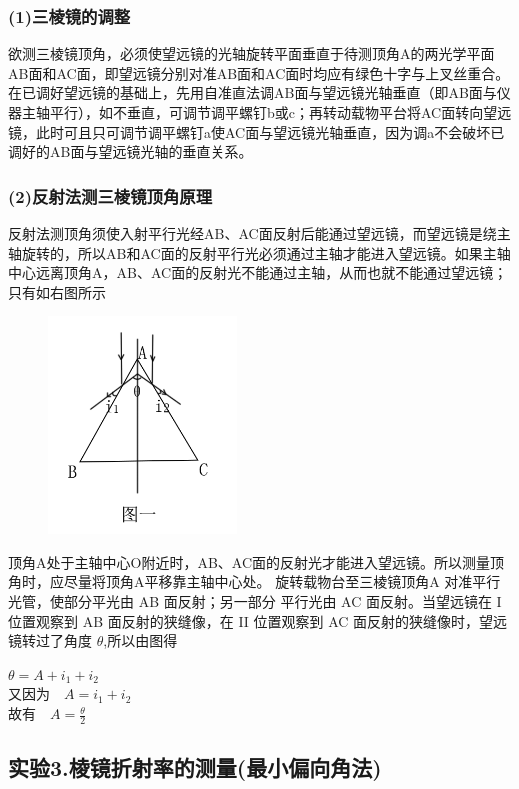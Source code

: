 \documentclass[11pt,a4paper,oneside]{article}
\begin{document}
\subsubsection*{(1)三棱镜的调整}
    欲测三棱镜顶角，必须使望远镜的光轴旋转平面垂直于待测顶角A的两光学平面AB面和AC面，即望远镜分别对准AB面和AC面时均应有绿色十字与上叉丝重合。\\
在已调好望远镜的基础上，先用自准直法调AB面与望远镜光轴垂直（即AB面与仪器主轴平行），如不垂直，可调节调平螺钉b或c；再转动载物平台将AC面转向望远镜，此时可且只可调节调平螺钉a使AC面与望远镜光轴垂直，因为调a不会破坏已调好的AB面与望远镜光轴的垂直关系。

\subsubsection*{(2)反射法测三棱镜顶角原理}
     反射法测顶角须使入射平行光经AB、AC面反射后能通过望远镜，而望远镜是绕主轴旋转的，所以AB和AC面的反射平行光必须通过主轴才能进入望远镜。如果主轴中心远离顶角A，AB、AC面的反射光不能通过主轴，从而也就不能通过望远镜；只有如右图所示
     
 \begin{figure}[H]
 \centering
  \includegraphics[width=5cm]{Image/反射法测顶角.png}
\end{figure}

     
     顶角A处于主轴中心O附近时，AB、AC面的反射光才能进入望远镜。所以测量顶角时，应尽量将顶角A平移靠主轴中心处。
     旋转载物台至三棱镜顶角A 对准平行光管，使部分平光由 AB 面反射；另一部分
平行光由 AC 面反射。当望远镜在 I 位置观察到 AB 面反射的狭缝像，在 II 位置观察到 AC 面反射的狭缝像时，望远镜转过了角度 $\theta$,所以由图得
\begin{center}
$\theta =A+i_{1}+i_{2}$\\
又因为　$A=i_{1}+i_{2}$\\
故有　$A=\displaystyle\frac{\theta}{2}$
\end{center}
     
\subsection*{实验3.棱镜折射率的测量(最小偏向角法)}
\end{document}
